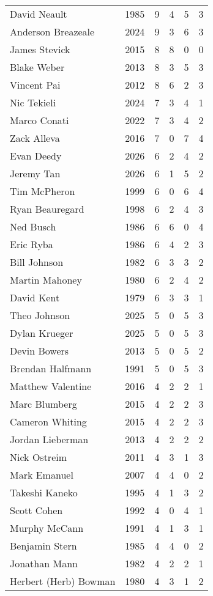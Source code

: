 \begin{longtable}{lccccc}
David Neault & 1985 & 9 & 4 & 5 & 3 \\
Anderson Breazeale & 2024 & 9 & 3 & 6 & 3 \\
James Stevick & 2015 & 8 & 8 & 0 & 0 \\
Blake Weber & 2013 & 8 & 3 & 5 & 3 \\
Vincent Pai & 2012 & 8 & 6 & 2 & 3 \\
Nic Tekieli & 2024 & 7 & 3 & 4 & 1 \\
Marco Conati & 2022 & 7 & 3 & 4 & 2 \\
Zack Alleva & 2016 & 7 & 0 & 7 & 4 \\
Evan Deedy & 2026 & 6 & 2 & 4 & 2 \\
Jeremy Tan & 2026 & 6 & 1 & 5 & 2 \\
Tim McPheron & 1999 & 6 & 0 & 6 & 4 \\
Ryan Beauregard & 1998 & 6 & 2 & 4 & 3 \\
Ned Busch & 1986 & 6 & 6 & 0 & 4 \\
Eric Ryba & 1986 & 6 & 4 & 2 & 3 \\
Bill Johnson & 1982 & 6 & 3 & 3 & 2 \\
Martin Mahoney & 1980 & 6 & 2 & 4 & 2 \\
David Kent & 1979 & 6 & 3 & 3 & 1 \\
Theo Johnson & 2025 & 5 & 0 & 5 & 3 \\
Dylan Krueger & 2025 & 5 & 0 & 5 & 3 \\
Devin Bowers & 2013 & 5 & 0 & 5 & 2 \\
Brendan Halfmann & 1991 & 5 & 0 & 5 & 3 \\
Matthew Valentine & 2016 & 4 & 2 & 2 & 1 \\
Marc Blumberg & 2015 & 4 & 2 & 2 & 3 \\
Cameron Whiting & 2015 & 4 & 2 & 2 & 3 \\
Jordan Lieberman & 2013 & 4 & 2 & 2 & 2 \\
Nick Ostreim & 2011 & 4 & 3 & 1 & 3 \\
Mark Emanuel & 2007 & 4 & 4 & 0 & 2 \\
Takeshi Kaneko & 1995 & 4 & 1 & 3 & 2 \\
Scott Cohen & 1992 & 4 & 0 & 4 & 1 \\
Murphy McCann & 1991 & 4 & 1 & 3 & 1 \\
Benjamin Stern & 1985 & 4 & 4 & 0 & 2 \\
Jonathan Mann & 1982 & 4 & 2 & 2 & 1 \\
Herbert (Herb) Bowman & 1980 & 4 & 3 & 1 & 2 \\

\end{longtable}
